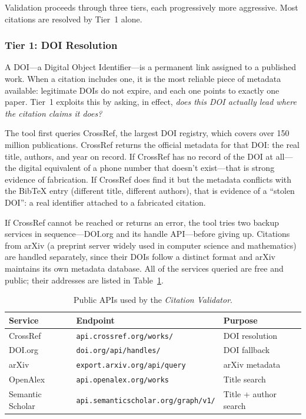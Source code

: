 Validation proceeds through three tiers, each progressively more aggressive. Most citations are resolved by Tier~1 alone.

\subsubsection{Tier 1: DOI Resolution}

A DOI---a Digital Object Identifier---is a permanent link assigned to a published work. When a citation includes one, it is the most reliable piece of metadata available: legitimate DOIs do not expire, and each one points to exactly one paper. Tier~1 exploits this by asking, in effect, \emph{does this DOI actually lead where the citation claims it does?}

The tool first queries CrossRef, the largest DOI registry, which covers over 150 million publications. CrossRef returns the official metadata for that DOI: the real title, authors, and year on record. If CrossRef has no record of the DOI at all---the digital equivalent of a phone number that doesn't exist---that is strong evidence of fabrication. If CrossRef does find it but the metadata conflicts with the BibTeX entry (different title, different authors), that is evidence of a ``stolen DOI'': a real identifier attached to a fabricated citation.

If CrossRef cannot be reached or returns an error, the tool tries two backup services in sequence---DOI.org and its handle API---before giving up. Citations from arXiv (a preprint server widely used in computer science and mathematics) are handled separately, since their DOIs follow a distinct format and arXiv maintains its own metadata database. All of the services queried are free and public; their addresses are listed in Table~\ref{tab:apis}.

\begin{table}[H]
\centering
\caption{Public APIs used by the \emph{Citation Validator}.}
\label{tab:apis}
\begin{tabular}{@{}lll@{}}
\toprule
\textbf{Service} & \textbf{Endpoint} & \textbf{Purpose} \\
\midrule
CrossRef    & \texttt{api.crossref.org/works/} & DOI resolution \\
DOI.org     & \texttt{doi.org/api/handles/}    & DOI fallback \\
arXiv       & \texttt{export.arxiv.org/api/query} & arXiv metadata \\
OpenAlex    & \texttt{api.openalex.org/works}   & Title search \\
Semantic Scholar & \texttt{api.semanticscholar.org/graph/v1/} & Title + author search \\
\bottomrule
\end{tabular}
\end{table}

